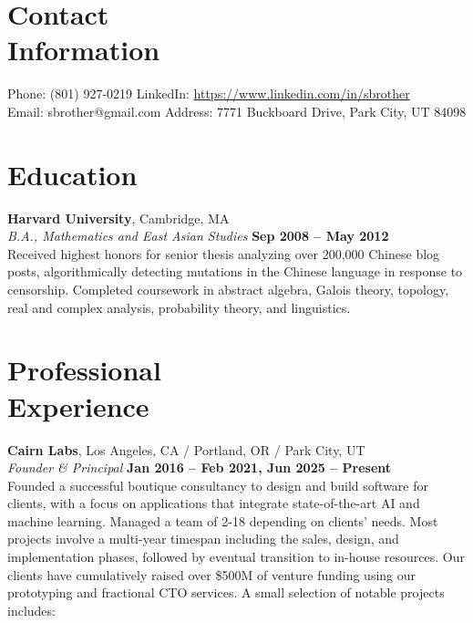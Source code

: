 \documentclass[margin,line]{resume}
\begin{document}
\begin{resume}
    \section{\mysidestyle Contact\\Information}

    Phone: (801) 927-0219       \hfill LinkedIn: \url{https://www.linkedin.com/in/sbrother} \\
    \noindent Email: sbrother@gmail.com  \hfill Address: 7771 Buckboard Drive, Park City, UT 84098 \vspace{0mm}\\\vspace{-4.5mm}

    \section{\mysidestyle Education}

    \textbf{Harvard University}, Cambridge, MA \vspace{2mm}\\\vspace{1mm}%
    \textsl{B.A., Mathematics and East Asian Studies} \hfill \textbf{Sep 2008 -- May 2012}\\
    Received highest honors for senior thesis analyzing over 200,000 Chinese
    blog posts, algorithmically detecting mutations in the Chinese language in
    response to censorship. Completed coursework in abstract algebra,
    Galois theory, topology, real and complex analysis, probability theory, and
    linguistics.

    \section{\mysidestyle Professional\\Experience}

    \textbf{Cairn Labs}, Los Angeles, CA / Portland, OR / Park City, UT \vspace{2mm}\\\vspace{1mm}%
    \textsl{Founder \& Principal} \hfill \textbf{Jan 2016 -- Feb 2021, Jun 2025 -- Present}\\
    Founded a successful boutique consultancy to design and build software
    for clients, with a focus on applications that integrate state-of-the-art
    AI and machine learning. Managed a team of 2-18 depending on clients' needs.
    Most projects involve a multi-year timespan including the sales, design, and
    implementation phases, followed by eventual transition to in-house
    resources. Our clients have cumulatively raised over \$500M of venture
    funding using our prototyping and fractional CTO services. A small selection
    of notable projects includes:


\end{resume}
\end{document}
